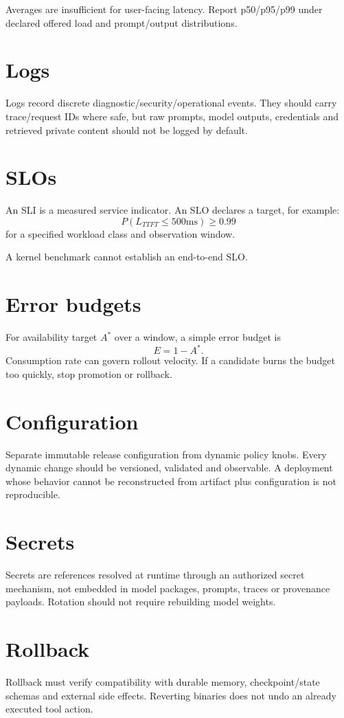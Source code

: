Averages are insufficient for user-facing latency. Report p50/p95/p99 under declared offered load and prompt/output distributions.

\section{Logs}
Logs record discrete diagnostic/security/operational events. They should carry trace/request IDs where safe, but raw prompts, model outputs, credentials and retrieved private content should not be logged by default.

\section{SLOs}
An SLI is a measured service indicator. An SLO declares a target, for example:
\[
P(L_{TTFT}\le 500\mathrm{ms})\ge 0.99
\]
for a specified workload class and observation window.


A kernel benchmark cannot establish an end-to-end SLO.

\section{Error budgets}
For availability target $A^*$ over a window, a simple error budget is
\[
E=1-A^*.
\]
Consumption rate can govern rollout velocity. If a candidate burns the budget too quickly, stop promotion or rollback.

\section{Configuration}
Separate immutable release configuration from dynamic policy knobs. Every dynamic change should be versioned, validated and observable. A deployment whose behavior cannot be reconstructed from artifact plus configuration is not reproducible.

\section{Secrets}
Secrets are references resolved at runtime through an authorized secret mechanism, not embedded in model packages, prompts, traces or provenance payloads. Rotation should not require rebuilding model weights.

\section{Rollback}
Rollback must verify compatibility with durable memory, checkpoint/state schemas and external side effects. Reverting binaries does not undo an already executed tool action.

